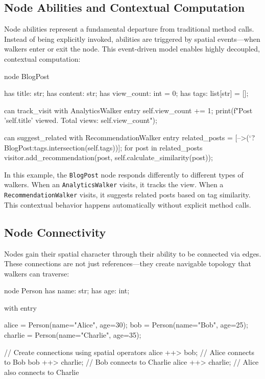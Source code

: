 \subsection{Node Abilities and Contextual Computation}

Node abilities represent a fundamental departure from traditional method calls. Instead of being explicitly invoked, abilities are triggered by spatial events—when walkers enter or exit the node. This event-driven model enables highly decoupled, contextual computation:

\begin{jacblock}
node BlogPost {
    has title: str;
    has content: str;
    has view_count: int = 0;
    has tags: list[str] = [];

    can track_visit with AnalyticsWalker entry {
        self.view_count += 1;
        print(f"Post '{self.title}' viewed. Total views: {self.view_count}");
    }

    can suggest_related with RecommendationWalker entry {
        related_posts = [-->(`?BlogPost:tags.intersection(self.tags))];
        for post in related_posts {
            visitor.add_recommendation(post, self.calculate_similarity(post));
        }
    }
}
\end{jacblock}

In this example, the \texttt{BlogPost} node responds differently to different types of walkers. When an \texttt{AnalyticsWalker} visits, it tracks the view. When a \texttt{RecommendationWalker} visits, it suggests related posts based on tag similarity. This contextual behavior happens automatically without explicit method calls.

\subsection{Node Connectivity}

Nodes gain their spatial character through their ability to be connected via edges. These connections are not just references—they create navigable topology that walkers can traverse:

\begin{jacblock}
node Person {
    has name: str;
    has age: int;
}

with entry {
    alice = Person(name="Alice", age=30);
    bob = Person(name="Bob", age=25);
    charlie = Person(name="Charlie", age=35);

    // Create connections using spatial operators
    alice ++> bob;      // Alice connects to Bob
    bob ++> charlie;    // Bob connects to Charlie
    alice ++> charlie;  // Alice also connects to Charlie
}
\end{jacblock}

